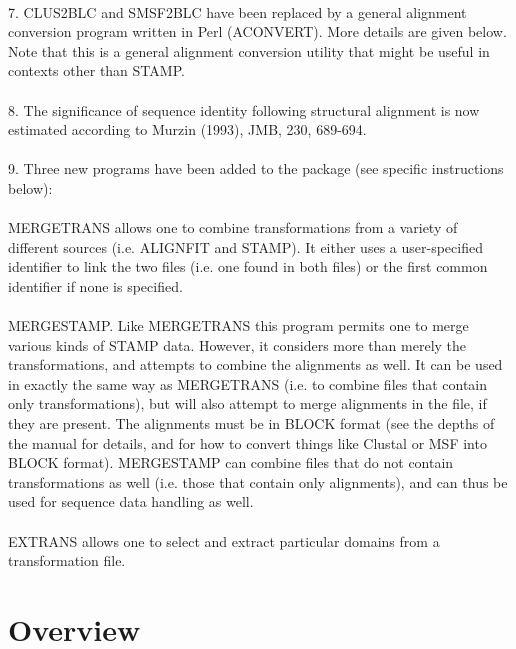 \\
7. CLUS2BLC and SMSF2BLC have been replaced by a general alignment conversion program written
in Perl (ACONVERT).  More details are given below.  Note that this is a general alignment
conversion utility that might be useful in contexts other than STAMP.\\
\\
8. The significance of sequence identity following structural alignment is now estimated 
according to Murzin (1993), JMB, 230, 689-694.\\
\\
9. Three new programs have been added to the package (see specific instructions below):\\
\\
MERGETRANS allows one to combine transformations from a variety of different 
sources (i.e. ALIGNFIT and STAMP).  It either uses a user-specified identifier to link the 
two files (i.e. one found in both files) or the first common identifier if none is specified.\\
\\
MERGESTAMP.  Like MERGETRANS this program permits one to merge
various kinds of STAMP data.  However, it considers more than merely
the transformations, and attempts to combine the alignments as well.
It can be used in exactly the same way as MERGETRANS (i.e. to combine
files that contain only transformations), but will also attempt to merge
alignments in the file, if they are present.  The alignments must be
in BLOCK format (see the depths of the manual for details, and for how
to convert things like Clustal or MSF into BLOCK format).  MERGESTAMP
can combine files that do not contain transformations as well (i.e. those
that contain only alignments), and can thus be used for sequence data
handling as well.\\
\\
EXTRANS allows one to select and extract particular domains from a transformation file. 


\section{Overview}

